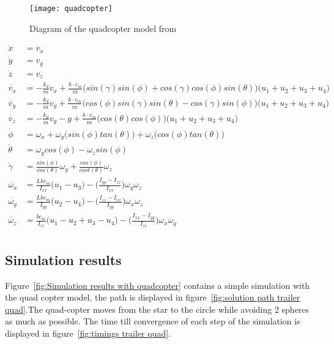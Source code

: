 \begin{figure}[h]
	\centering
	\texttt{[image: quadcopter]}
	\caption{Diagram of the quadcopter model from  \cite{Agudelo}}
	\label{fig:quadcopter model diagram}
\end{figure}

\begin{equation}
	\begin{aligned}
		\dot{x} &= v_x \\
		\dot{y} &= v_y \\
		\dot{z} &= v_z \\
		\dot{v_x} &= -\frac{k_d}{m}v_x + \frac{k \cdot c_m}{m}\Big(sin(\gamma)sin(\phi)+cos(\gamma)cos(\phi)sin(\theta)\Big)\Big(u_1 + u_2 + u_3 + u_4\Big) \\
		\dot{v_y} &= -\frac{k_d}{m}v_y + \frac{k \cdot c_m}{m}\Big(cos(\phi)sin(\gamma)sin(\theta)-cos(\gamma)sin(\phi)\Big)\Big(u_1 + u_2 + u_3 + u_4\Big) \\
		\dot{v_z} &= -\frac{k_d}{m}v_y -g + \frac{k \cdot c_m}{m}\Big(cos(\theta)cos(\phi)\Big)\Big(u_1 + u_2 + u_3 + u_4\Big) \\
		\dot{\phi} &= \omega_x + \omega_y\Big( sin(\phi)tan(\theta) \Big) + \omega_z \Big( cos(\phi) tan(\theta) \Big) \\
		\dot{\theta} &= \omega_y cos(\phi) - \omega_z sin(\phi) \\
		\dot{\gamma} &= \frac{sin(\phi)}{cos(\theta)}\omega_y + \frac{cos(\phi)}{cost(\theta)} \omega_z \\
		\dot{\omega_x} &= \frac{Lkc_m}{I_{xx}}\Big( u_1 - u_3 \Big) - \Big( \frac{I_{yy}-I_{zz}}{I_{xx}} \Big) \omega_y \omega_z\\
		\dot{\omega_y} &= \frac{Lkc_m}{I_{yy}}\Big( u_2 - u_4 \Big) - \Big( \frac{I_{zz}-I_{xx}}{I_{yy}} \Big) \omega_x \omega_z\\
		\dot{\omega_z} &= \frac{bc_m}{I_{zz}}\Big( u_1 - u_2 + u_3 - u_4 \Big) - \Big( \frac{I_{xx}-I_{yy}}{I_{zz}} \Big) \omega_x \omega_y\\
	\end{aligned}
	\label{eq:mathematical model quadcopter}
\end{equation}

\subsection{Simulation results}
Figure~\ref{fig:Simulation results with quadcopter} contains a simple simulation with the quad copter model, the path is displayed in figure~\ref{fig:solution path trailer quad}.The quad-copter moves from the star to the circle while avoiding 2 spheres as much as possible. The time till convergence of each step of the simulation is displayed in figure~\ref{fig:timings trailer quad}.


